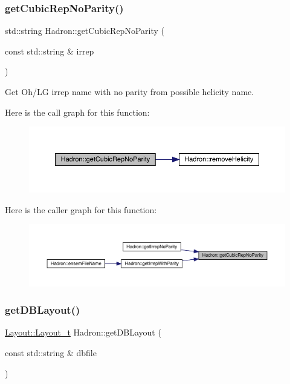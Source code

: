 \subsubsection{\texorpdfstring{getCubicRepNoParity()}{getCubicRepNoParity()}}
{\footnotesize\ttfamily std\+::string Hadron\+::get\+Cubic\+Rep\+No\+Parity (\begin{DoxyParamCaption}\item[{const std\+::string \&}]{irrep }\end{DoxyParamCaption})}



Get Oh/\+LG irrep name with no parity from possible helicity name. 

Here is the call graph for this function\+:
\nopagebreak
\begin{figure}[H]
\begin{center}
\leavevmode
\includegraphics[width=350pt]{d1/daf/namespaceHadron_a6efae379facc253e72b35cf4d235dc88_cgraph}
\end{center}
\end{figure}
Here is the caller graph for this function\+:
\nopagebreak
\begin{figure}[H]
\begin{center}
\leavevmode
\includegraphics[width=350pt]{d1/daf/namespaceHadron_a6efae379facc253e72b35cf4d235dc88_icgraph}
\end{center}
\end{figure}
\mbox{\label{namespaceHadron_af18d764aba83c32e26a22d75ed2dfbf7}} 
\subsubsection{\texorpdfstring{getDBLayout()}{getDBLayout()}}
{\footnotesize\ttfamily \mbox{\hyperlink{structHadron_1_1Layout_1_1Layout__t}{Layout\+::\+Layout\+\_\+t}} Hadron\+::get\+D\+B\+Layout (\begin{DoxyParamCaption}\item[{const std\+::string \&}]{dbfile }\end{DoxyParamCaption})}


